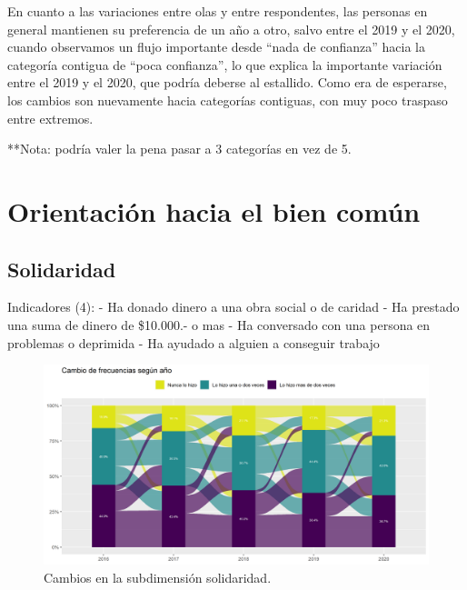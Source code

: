 \documentclass[
  12pt,
]{book}
\begin{document}
En cuanto a las variaciones entre olas y entre respondentes, las personas en general mantienen su preferencia de un año a otro, salvo entre el 2019 y el 2020, cuando observamos un flujo importante desde ``nada de confianza'' hacia la categoría contigua de ``poca confianza'', lo que explica la importante variación entre el 2019 y el 2020, que podría deberse al estallido. Como era de esperarse, los cambios son nuevamente hacia categorías contiguas, con muy poco traspaso entre extremos.

**Nota: podría valer la pena pasar a 3 categorías en vez de 5.

\hypertarget{orientaciuxf3n-hacia-el-bien-comuxfan-1}{%
\section{Orientación hacia el bien común}\label{orientaciuxf3n-hacia-el-bien-comuxfan-1}}

\hypertarget{solidaridad}{%
\subsection{Solidaridad}\label{solidaridad}}

Indicadores (4):
- Ha donado dinero a una obra social o de caridad
- Ha prestado una suma de dinero de \$10.000.- o mas
- Ha conversado con una persona en problemas o deprimida
- Ha ayudado a alguien a conseguir trabajo

\begin{figure}[H]

{\centering \includegraphics[width=1\linewidth,height=1\textheight]{output/graphs/alluvial_solidaridad} 

}

\caption{Cambios en la subdimensión  solidaridad.}\label{fig:alluvial-solidaridad}
\end{figure}
\end{document}
